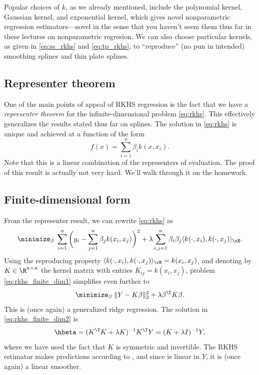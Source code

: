 \documentclass{article}
\begin{document}
Popular choices of $k$, as we already mentioned, include the polynomial kernel,
Gaussian kernel, and exponential kernel, which gives novel nonparametric
regression estimators---novel in the sense that you haven't seem them thus far
in these lectures on nonparametric regresion. We can also choose particular
kernels, as given in \eqref{eq:ss_rkhs} and \eqref{eq:tp_rkhs}, to ``reproduce''
(no pun in intended) smoothing splines and thin plate splines. 


\subsection{Representer theorem}

One of the main points of appeal of RKHS regression is the fact that we have a
\emph{representer theorem} for the infinite-dimensional problem \eqref{eq:rkhs}.
This effectively generalizes the results stated thus far on splines. The
solution in \eqref{eq:rkhs} is unique and achieved at a function of the form   
\[
f(x) = \sum_{i=1}^n \beta_i k(x, x_i).
\]
Note that this is a linear combination of the representers of evaluation. The
proof of this result is actually not very hard. We'll walk through it on the
homework.  

\subsection{Finite-dimensional form}

From the representer result, we can rewrite \eqref{eq:rkhs} as
\begin{equation}
\label{eq:rkhs_finite_dim1}
\minimize_\beta \; \sum_{i=1}^n \bigg( y_i - \sum_{j=1}^n \beta_j k(x_i, x_j) 
\bigg)^2 + \lambda \sum_{i,j=1}^n \beta_i \beta_j \langle k(\cdot, x_i) ,
k(\cdot, x_j) \rangle_\cH.
\end{equation}
Using the reproducing property $\langle k(\cdot, x_i), k(\cdot, x_j) \rangle_\cH
= k(x_i, x_j)$, and denoting by $K \in \R^{n \times n}$ the kernel matrix with
entries $K_{ij} = k(x_i, x_j)$, problem \eqref{eq:rkhs_finite_dim1} simplifies
even further to
\begin{equation}
\label{eq:rkhs_finite_dim2}
\minimize_\beta \; \|Y - K\beta\|_2^2 + \lambda \beta^\T K \beta.
\end{equation}
This is (once again) a generalized ridge regression. The solution in
\eqref{eq:rkhs_finite_dim2} is 
\[
\hbeta = (K^\T K + \lambda K)^{-1} K^\T Y = (K + \lambda I)^{-1} Y,
\]
where we have used the fact that $K$ is symmetric and invertible. The RKHS
estimator makes predictions according to , and since \smash{$\hbeta$} is linear in $Y$, it is (once again) a
linear smoother. 



\end{document}

